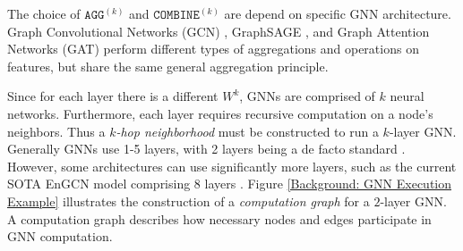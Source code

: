 The choice of $\mathtt{AGG}^{(k)}$ and $\mathtt{COMBINE}^{(k)}$ are depend on specific GNN architecture. Graph Convolutional Networks (GCN) \cite{GCN_2016}, GraphSAGE \cite{GraphSAGE_2017}, and Graph Attention Networks (GAT) \cite{GAT_2018} perform different types of aggregations and operations on features, but share the same general aggregation principle.

Since for each layer there is a different $W^k$, GNNs are comprised of $k$ neural networks. Furthermore, each layer requires recursive computation on a node's neighbors. Thus a \textit{$k$-hop neighborhood} must be constructed to run a $k$-layer GNN.
Generally GNNs use 1-5 layers, with 2 layers being a de facto standard \cite{Survey_First_2022}. However, some architectures can use significantly more layers, such as the current SOTA EnGCN model comprising 8 layers \cite{EnGCN_2023}.
Figure \ref{Background: GNN Execution Example} illustrates the construction of a \textit{computation graph} for a $2$-layer GNN. A computation graph describes how necessary nodes and edges participate in GNN computation.


